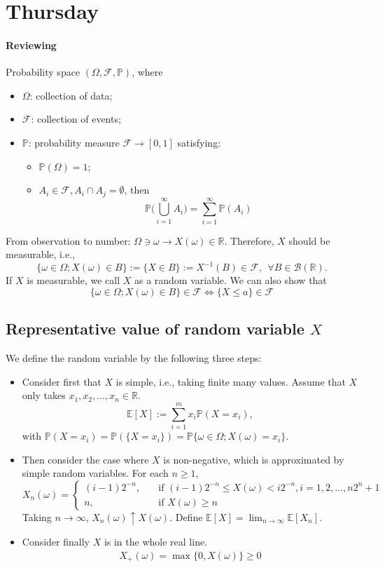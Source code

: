 
\section{Thursday}
\paragraph{Reviewing}
Probability space $(\Omega,\mathcal{F},\mathbb{P})$, where
\begin{itemize}
\item
$\Omega$: collection of data;
\item
$\mathcal{F}$: collection of events;
\item
$\mathbb{P}$: probability measure $\mathcal{F}\to[0,1]$ satisfying:
\begin{itemize}
\item
$\mathbb{P}(\Omega)=1$;
\item
$A_i\in\mathcal{F}, A_i\cap A_j=\emptyset$, then
\[
\mathbb{P}\bigg(
\bigcup_{i=1}^\infty A_i
\bigg)
=
\sum_{i=1}^\infty\mathbb{P}(A_i)
\]
\end{itemize}
\end{itemize}

From observation to number: $\Omega\ni\omega\to X(\omega)\in\mathbb{R}$.
Therefore, $X$ should be measurable, i.e.,
\[
\{\omega\in\Omega; X(\omega)\in B\}:=\{X\in B\}:=X^{-1}(B)\in\mathcal{F}, ~~\forall B\in\mathcal{B}(\mathbb{R}).
\]
If $X$ is measurable, we call $X$ as a random variable.
We can also show that
\[
\{\omega\in\Omega; X(\omega)\in B\}\in\mathcal{F}\Longleftrightarrow
\{X\le a\}\in\mathcal{F}
\]


\subsection{Representative value of random variable $X$}
We define the random variable by the following three steps:
\begin{itemize}
\item
Consider first that $X$ is simple, i.e., taking finite many values.
Assume that $X$ only takes $x_1,x_2,\ldots,x_n\in\mathbb{R}$.
\[
\mathbb{E}[X]:=\sum_{i=1}^m x_i\mathbb{P}(X=x_i),
\]
with $\mathbb{P}(X = x_i) = \mathbb{P}(\{X=x_i\})=\mathbb{P}\{\omega\in\Omega; X(\omega)=x_i\}$.
\item
Then consider the case where $X$ is non-negative, which is approximated by simple random variables.
For each $n\ge1$, 
\[
X_n(\omega) = \left\{
\begin{aligned}
(i-1)2^{-n},&\quad\text{if $(i-1)2^{-n}\le X(\omega)<i2^{-n}, i=1,2,\dots,n2^n+1$}\\
n,&\quad\text{if $X(\omega)\ge n$}
\end{aligned}
\right.
\]
Taking $n\to\infty$, $X_n(\omega)\uparrow X(\omega)$.
Define $\mathbb{E}[X] = \lim_{n\to\infty}\mathbb{E}[X_n]$.
\item
Consider finally $X$ is in the whole real line.
\begin{align*}
X_+(\omega) = \max\{0, X(\omega)\}\ge0
\end{align*}
\end{itemize}


